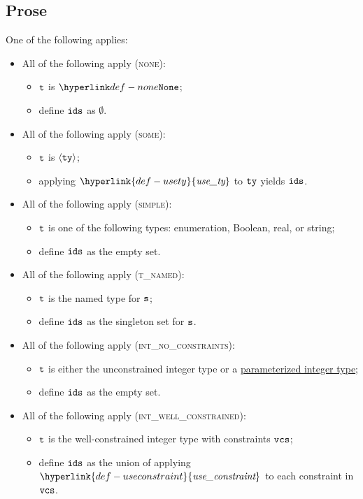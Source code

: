 \documentclass{book}
\newcommand\usety[0]{\hyperlink{def-usety}{\textfunc{use\_ty}}}
\newcommand\useconstraint[0]{\hyperlink{def-useconstraint}{\textfunc{use\_constraint}}}
\newcommand\parameterizedintegertype[0]{\hyperlink{def-parameterizedintegertype}{parameterized integer type}}
\begin{document}
\subsection{Prose}
One of the following applies:
\begin{itemize}
  \item All of the following apply (\textsc{none}):
  \begin{itemize}
    \item $\texttt{t}$ is $\None$;
    \item define $\texttt{ids}$ as $\emptyset$.
  \end{itemize}

  \item All of the following apply (\textsc{some}):
  \begin{itemize}
    \item $\texttt{t}$ is $\langle\texttt{ty}\rangle$;
    \item applying $\usety$ to $\texttt{ty}$ yields $\texttt{ids}$.
  \end{itemize}

  \item All of the following apply (\textsc{simple}):
  \begin{itemize}
    \item $\texttt{t}$ is one of the following types: enumeration, Boolean, real, or string;
    \item define $\texttt{ids}$ as the empty set.
  \end{itemize}

  \item All of the following apply (\textsc{t\_named}):
  \begin{itemize}
    \item $\texttt{t}$ is the named type for $\texttt{s}$;
    \item define $\texttt{ids}$ as the singleton set for $\texttt{s}$.
  \end{itemize}

  \item All of the following apply (\textsc{int\_no\_constraints}):
  \begin{itemize}
    \item $\texttt{t}$ is either the unconstrained integer type or a \parameterizedintegertype;
    \item define $\texttt{ids}$ as the empty set.
  \end{itemize}

  \item All of the following apply (\textsc{int\_well\_constrained}):
  \begin{itemize}
    \item $\texttt{t}$ is the well-constrained integer type with constraints $\texttt{vcs}$;
    \item define $\texttt{ids}$ as the union of applying $\useconstraint$ to each constraint in $\texttt{vcs}$.
  \end{itemize}


\end{itemize}
\end{document}
